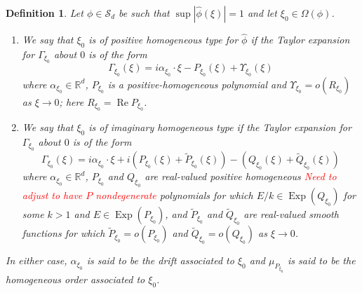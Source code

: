 \documentclass[11pt]{article}
\newtheorem{definition}[theorem]{Definition}
\renewcommand\Re{\operatorname{Re}}%
\newcommand\Exp{\operatorname{Exp}}
\begin{document}
\begin{definition}\label{def:Types}
Let $\phi\in\mathcal{S}_d$ be such that $\sup|\hat\phi(\xi)|=1$ and let $\xi_0\in\Omega(\phi)$. 
\begin{enumerate}
    \item We say that $\xi_0$ is of positive homogeneous type for $\hat\phi$ if the Taylor expansion for $\Gamma_{\xi_0}$ about $0$ is of the form
\begin{equation}\label{eq:PosHomType}
\Gamma_{\xi_0}(\xi)=i\alpha_{\xi_0}\cdot\xi-P_{\xi_0}(\xi)+\Upsilon_{\xi_0}(\xi)
\end{equation}
where $\alpha_{\xi_0}\in\mathbb{R}^d$, $P_{\xi_0}$ is a positive-homogeneous polynomial and $\Upsilon_{\xi_0}=o(R_{\xi_0})$ as $\xi\rightarrow 0$; here $R_{\xi_0}=\Re P_{\xi_0}$.
\item We say that $\xi_0$ is of imaginary homogeneous type if the Taylor expansion for $\Gamma_{\xi_0}$ about $0$ is of the form
\begin{equation*}
    \Gamma_{\xi_0}(\xi)=i\alpha_{\xi_0}\cdot\xi +i\left(P_{\xi_0}(\xi)+\widetilde{P}_{\xi_0}(\xi)\right)-\left(Q_{\xi_0}(\xi)+\widetilde{Q}_{\xi_0}(\xi)\right)
\end{equation*}
where $\alpha_{\xi_0}\in\mathbb{R}^d$, $P_{\xi_0}$ and $Q_{\xi_0}$ are real-valued positive homogeneous \textcolor{red}{Need to adjust to have $P$ nondegenerate} polynomials for which $E/k\in\Exp(Q_{\xi_0})$ for some $k>1$ and $E\in\Exp(P_{\xi_0})$, and $\widetilde{P}_{\xi_0}$ and $\widetilde{Q}_{\xi_0}$ are real-valued smooth functions for which $\widetilde{P}_{\xi_0}=o(P_{\xi_0})$ and $\widetilde{Q}_{\xi_0}=o(Q_{\xi_0})$ as $\xi\to 0$.
\end{enumerate}
In either case, $\alpha_{\xi_0}$ is said to be the drift associated to $\xi_0$ and $\mu_{P_{\xi_0}}$ is said to be the homogeneous order associated to $\xi_0$.
\end{definition}
\end{document}
